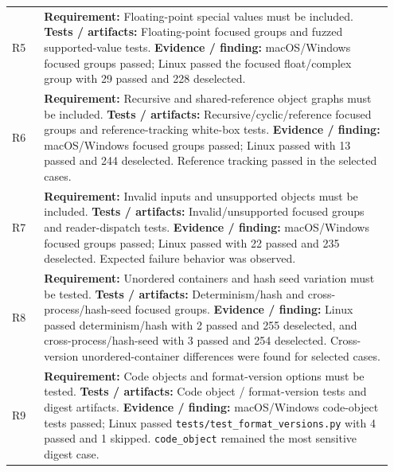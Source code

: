 \documentclass[10pt,a4paper]{article}
\begin{document}
\begin{longtable}{@{}L{0.08\linewidth}L{0.87\linewidth}@{}}
R5 &
\textbf{Requirement:} Floating-point special values must be included. \newline
\textbf{Tests / artifacts:} Floating-point focused groups and fuzzed supported-value tests. \newline
\textbf{Evidence / finding:} macOS/Windows focused groups passed; Linux passed the focused float/complex group with 29 passed and 228 deselected. \\

R6 &
\textbf{Requirement:} Recursive and shared-reference object graphs must be included. \newline
\textbf{Tests / artifacts:} Recursive/cyclic/reference focused groups and reference-tracking white-box tests. \newline
\textbf{Evidence / finding:} macOS/Windows focused groups passed; Linux passed with 13 passed and 244 deselected. Reference tracking passed in the selected cases. \\

R7 &
\textbf{Requirement:} Invalid inputs and unsupported objects must be included. \newline
\textbf{Tests / artifacts:} Invalid/unsupported focused groups and reader-dispatch tests. \newline
\textbf{Evidence / finding:} macOS/Windows focused groups passed; Linux passed with 22 passed and 235 deselected. Expected failure behavior was observed. \\

R8 &
\textbf{Requirement:} Unordered containers and hash seed variation must be tested. \newline
\textbf{Tests / artifacts:} Determinism/hash and cross-process/hash-seed focused groups. \newline
\textbf{Evidence / finding:} Linux passed determinism/hash with 2 passed and 255 deselected, and cross-process/hash-seed with 3 passed and 254 deselected. Cross-version unordered-container differences were found for selected cases. \\

R9 &
\textbf{Requirement:} Code objects and format-version options must be tested. \newline
\textbf{Tests / artifacts:} Code object / format-version tests and digest artifacts. \newline
\textbf{Evidence / finding:} macOS/Windows code-object tests passed; Linux passed \texttt{tests/test\_format\_versions.py} with 4 passed and 1 skipped. \texttt{code\_object} remained the most sensitive digest case. \\


\end{longtable}
\end{document}
